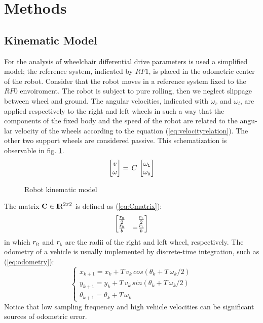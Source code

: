 \section{Methods}
\subsection{Kinematic Model}
For the analysis of wheelchair differential drive parameters is used a simplified model; the reference system, indicated by $RF1$, is placed in the odometric center of the robot. Consider that the robot moves in a reference system fixed to the $RF0$ envoiroment. The robot is subject to pure rolling, then we neglect slippage between wheel and ground. The angular velocities, indicated with $\omega_r$ and $\omega_l$, are applied respectively to the right and left wheels in such a way that the components of the fixed body and the speed of the robot are related to the angu- lar velocity of the wheels according to the equation (\ref{eq:velocityrelation}). The other two support wheels are considered passive. This schematization is observable in fig. \ref{fig:model}.
\begin{equation}
\label{eq:velocityrelation}
	\begin{bmatrix}
		v\\									
		\omega 
	\end{bmatrix} 
	=\, C\,
	\begin{bmatrix}
		\omega_\textsc{l} \\ 
		\omega_\textsc{r}
	\end{bmatrix}
\end{equation}

\begin{figure}[!h]
\centering
    \resizebox{.8\linewidth}{!}{}
\caption{Robot kinematic model}
\label{fig:model}
\end{figure}
\noindent The matrix $\textbf{C} \in \operatorname{\rm I\!R}^{2 x 2}$ is defined as (\ref{eq:Cmatrix}):
\begin{equation}
\label{eq:Cmatrix}
	\begin{bmatrix*}[r]
		\frac{r_\textsc{r}}{2} &	\frac{r_\textsc{l}}{2} \\
		\frac{r_\textsc{r}}{b} &	-\frac{r_\textsc{l}}{b} 
	\end{bmatrix*}
\end{equation}
in which $r_\textsc{r}$ and $r_\textsc{l}$ are the radii of the right and left wheel, respectively.
The odometry of a vehicle is usually implemented by discrete-time integration, such as (\ref{eq:odometry}):
\begin{equation}
\label{eq:odometry}
	\begin{cases}
		x_{k+1} = x_{k} + T \, v_{k} \, cos(\theta_{k} + T \,\omega_{k}/2)\\
		y_{k+1} = y_{k} + T \, v_{k} \, sin(\theta_{k} + T \, \omega_{k}/2)\\
		\theta_{k+1} = \theta_{k} + T \, \omega_{k}
	\end{cases}
\end{equation}
Notice that low sampling frequency and high vehicle velocities can be significant sources of odometric error.

